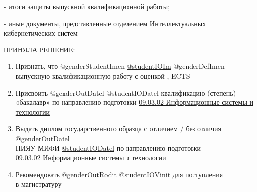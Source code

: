 \documentclass[a4paper,12pt]{article} %
\begin{document}
- итоги защиты выпускной квалификационной работы;

- иные документы, представленные отделением Интеллектуальных кибернетических систем

\par\medskip

ПРИНЯЛА РЕШЕНИЕ:

\begin{enumerate}
	\item 	Признать, что @genderStudentImen \underline{@studentIOIm} @genderDefImen \\
	выпускную квалификационную работу с оценкой \makebox[10mm]{\hrulefill}\makebox[10mm]{\hrulefill}, ECTS \makebox[10mm]{\hrulefill}. 
	\vspace{-0.25cm}
	\item 	Присвоить @genderOutDatel \underline{@studentIODatel} квалификацию (степень)\\ 
	«бакалавр» по направлению подготовки \underline{09.03.02 Информационные системы и технологии} 
	\vspace{-0.25cm}
	\item 	Выдать диплом государственного образца с отличием / без отличия @genderOutDatel \\
	НИЯУ МИФИ \underline{@studentIODatel} по направлению подготовки\\
	\underline{09.03.02 Информационные системы и технологии} 
	\vspace{-0.20cm}
	\item 	Рекомендовать @genderOutRodit \underline{@studentIOVinit}  для поступления\\
	 в магистратуру
	\vspace{-0.25cm}
\end{enumerate}
\par\bigskip
\end{document}
